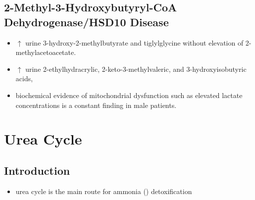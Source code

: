 \documentclass[12pt]{scrartcl}
\begin{document}
\subsection{2-Methyl-3-Hydroxybutyryl-CoA Dehydrogenase/HSD10 Disease}
\label{sec:org1658b95}
\begin{itemize}
\item \(\uparrow\) urine 3-hydroxy-2-methylbutyrate and tiglylglycine without elevation of 2-methylacetoacetate.
\item \(\uparrow\) urine 2-ethylhydracrylic, 2-keto-3-methylvaleric, and 3-hydroxyisobutyric acids,
\item biochemical evidence of mitochondrial dysfunction such as elevated
lactate concentrations is a constant finding in male patients.
\end{itemize}

\section{Urea Cycle}
\label{sec:org1257177}
\subsection{Introduction}
\label{sec:orgf8c11dd}
\begin{itemize}
\item urea cycle is the main route for ammonia () detoxification
\end{itemize}

\begin{center}
\chemnameinit{}
\hspace{20}
\chemnameinit{}
\end{center}

\begin{center}
\chemnameinit{}
\end{center}

\begin{center}
\chemnameinit{}
\end{center}
\end{document}
